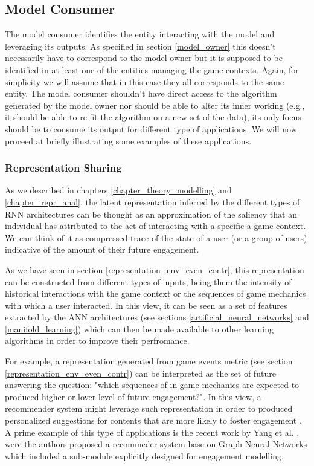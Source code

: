 \subsection{Model Consumer}
\label{model_consumer}
The model consumer identifies the entity interacting with the model and leveraging its outputs. As specified in section \ref{model_owner} this doesn't necessarily have to correspond to the model owner but it is supposed to be identified in at least one of the entities managing the game contexts. Again, for simplicity we will assume that in this case they all corresponds to the same entity. The model consumer shouldn't have direct access to the algorithm generated by the model owner nor should be able to alter its inner working (e.g., it should be able to re-fit the algorithm on a new set of the data), its only focus should be to consume its output for different type of applications. We will now proceed at briefly illustrating some examples of these applications.

\subsubsection{Representation Sharing}
\label{represenation_sharing}
As we described in chapters \ref{chapter_theory_modelling} and \ref{chapter_repr_anal}, the latent representation inferred by the different types of RNN architectures can be thought as an approximation of the saliency that an individual has attributed to the act of interacting with a specific a game context. We can think of it as compressed trace of the state of a user (or a group of users) indicative of the amount of their future engagement. 

As we have seen in section \ref{representation_env_even_contr}, this representation can be constructed from different types of inputs, being them the intensity of historical interactions with the game context or the sequences of game mechanics with which a user interacted. In this view, it can be seen as a set of features extracted by the ANN architectures (see sections \ref{artificial_neural_networks} and \ref{manifold_learning}) which can then be made available to other learning algorithms in order to improve their perfromance. 

For example, a representation generated from game events metric (see section \ref{representation_env_even_contr}) can be interpreted as the set of future answering the question: "which sequences of in-game mechanics are expected to produced higher or lover level of future engagement?". In this view, a recommender system might leverage such representation in order to produced personalized suggestions for contents that are more likely to foster engagement \cite{bertens2018machine}. A prime example of this type of applications is the recent work by Yang et al. \cite{yang2022large}, were the authors proposed a recommeder system base on Graph Neural Networks which included a sub-module explicitly designed for engagement modelling. 

